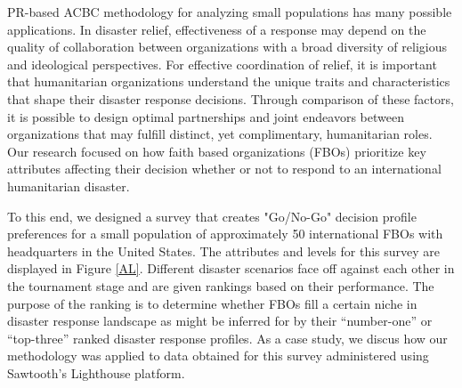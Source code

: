 \documentclass[a4paper, 12pt]{article}
\begin{document}
PR-based ACBC methodology for analyzing small populations has many possible applications. In disaster relief, effectiveness of a response may depend on the quality of collaboration between organizations with a broad diversity of religious and ideological perspectives. For effective coordination of relief, it is important that humanitarian organizations understand the unique traits and characteristics that shape their disaster response decisions. Through comparison of these factors, it is possible to design optimal partnerships and joint endeavors between organizations that may fulfill distinct, yet complimentary, humanitarian roles. Our research focused on how faith based organizations (FBOs) prioritize key attributes affecting their decision whether or not to respond to an international humanitarian disaster. 

To this end, we designed a survey that creates "Go/No-Go" decision profile preferences for a small population of approximately 50 international FBOs with headquarters in the United States. The attributes and levels for this survey are displayed in Figure \ref{AL}. Different disaster scenarios face off against each other in the tournament stage and are given rankings based on their performance. The purpose of the ranking is to determine whether FBOs fill a certain niche in disaster response landscape as might be inferred for by their ``number-one'' or ``top-three'' ranked disaster response profiles. As a case study, we discus how our methodology was applied to data obtained for this survey administered using Sawtooth's Lighthouse platform.
\end{document}
